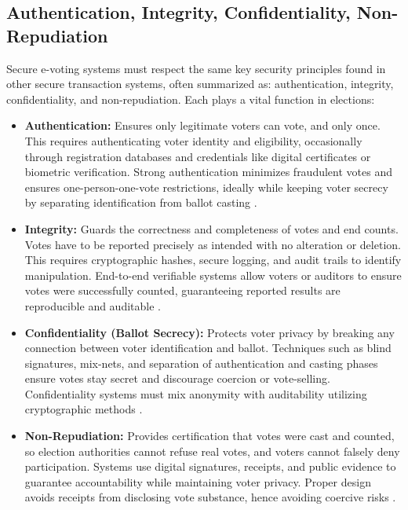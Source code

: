 \documentclass[a4paper,10pt]{report}
\begin{document}
\subsection{Authentication, Integrity, Confidentiality, Non-Repudiation}

Secure e-voting systems must respect the same key security principles found in other secure transaction systems, often summarized as: authentication, integrity, confidentiality, and non-repudiation.   Each plays a vital function in elections:

  \begin{itemize} \item \textbf  {Authentication:}   Ensures only legitimate voters can vote, and only once.   This requires authenticating voter identity and eligibility, occasionally through registration databases and credentials like digital certificates or biometric verification.   Strong authentication minimizes fraudulent votes and ensures one-person-one-vote restrictions, ideally while keeping voter secrecy by separating identification from ballot casting \cite{mdpi2020}.
    
      \item \textbf  {Integrity:}   Guards the correctness and completeness of votes and end counts.   Votes have to be reported precisely as intended with no alteration or deletion.   This requires cryptographic hashes, secure logging, and audit trails to identify manipulation.   End-to-end verifiable systems allow voters or auditors to ensure votes were successfully counted, guaranteeing reported results are reproducible and auditable \cite{mdpi2020}.
    
      \item \textbf  {Confidentiality (Ballot Secrecy):}   Protects voter privacy by breaking any connection between voter identification and ballot.   Techniques such as blind signatures, mix-nets, and separation of authentication and casting phases ensure votes stay secret and discourage coercion or vote-selling.   Confidentiality systems must mix anonymity with auditability utilizing cryptographic methods \cite{mdpi2020}.
    
      \item \textbf  {Non-Repudiation:}   Provides certification that votes were cast and counted, so election authorities cannot refuse real votes, and voters cannot falsely deny participation.   Systems use digital signatures, receipts, and public evidence to guarantee accountability while maintaining voter privacy.   Proper design avoids receipts from disclosing vote substance, hence avoiding coercive risks   \cite{arxiv2021}. \end{itemize}
\end{document}
